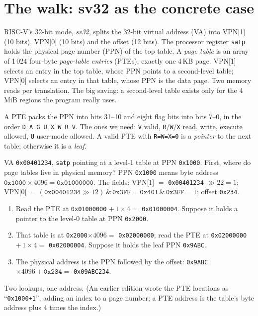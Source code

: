 \section{The walk: sv32 as the concrete case}
\label{sec:sv32_11}

RISC-V's 32-bit mode, \emph{sv32}, splits the 32-bit virtual address (VA)
into VPN[1] (10 bits), VPN[0] (10 bits) and the offset (12 bits). The
processor register \texttt{satp} holds the physical page number (PPN) of
the top table. A \emph{page table} is an array of 1\,024 four-byte
\emph{page-table entries} (PTEs), exactly one 4\,KB page. VPN[1]
selects an entry in the top table, whose PPN points to a second-level
table; VPN[0] selects an entry in that table, whose PPN is the data
page. Two memory reads per translation. The big saving: a second-level
table exists only for the 4\,MiB regions the program really uses.

A PTE packs the PPN into bits 31--10 and eight flag bits into bits 7--0,
in the order \texttt{D A G U X W R V}. The ones we need: \texttt{V}
valid, \texttt{R}/\texttt{W}/\texttt{X} read, write, execute allowed,
\texttt{U} user-mode allowed. A valid PTE with \texttt{R=W=X=0} is a
\emph{pointer} to the next table; otherwise it is a \emph{leaf}.



\begin{example}
VA \texttt{0x00401234}, \texttt{satp} pointing at a level-1 table at PPN
\texttt{0x1000}. First, where do page tables live in physical memory?
PPN \texttt{0x1000} means byte address \(\texttt{0x1000}\times4096=
\texttt{0x01000000}\). The fields: VPN[1] \(=\) \texttt{0x00401234}
\(\gg22 = 1\); VPN[0] \(= (\texttt{0x00401234}\gg12)\,\&\,\texttt{0x3FF} =
\texttt{0x401}\,\&\,\texttt{0x3FF}=1\); offset \texttt{0x234}.
\begin{enumerate}
\item Read the PTE at \texttt{0x01000000} \(+\,1\times4=\) \texttt{0x01000004}.
      Suppose it holds a pointer to the level-0 table at PPN
      \texttt{0x2000}.
\item That table is at \texttt{0x2000}\(\times4096=\) \texttt{0x02000000}; read the
      PTE at \texttt{0x02000000} \(+\,1\times4=\) \texttt{0x02000004}. Suppose
      it holds the leaf PPN \texttt{0x9ABC}.
\item The physical address is the PPN followed by the offset:
      \texttt{0x9ABC}\(\times4096+\texttt{0x234}=\) \texttt{0x09ABC234}.
\end{enumerate}
Two lookups, one address. (An earlier edition wrote the PTE locations as
``\texttt{0x1000+1}'', adding an index to a page number; a PTE address
is the table's byte address plus 4 times the index.)
\end{example}

